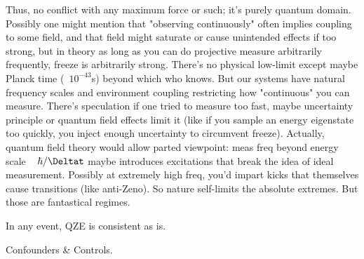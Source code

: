 \documentclass[11pt]{article}
\begin{document}
Thus, no conflict with any maximum force or such; it's purely quantum domain. Possibly one might mention that "observing continuously" often implies coupling to some field, and that field might saturate or cause unintended effects if too strong, but in theory as long as you can do projective measure arbitrarily frequently, freeze is arbitrarily strong. There's no physical low-limit except maybe Planck time (~$10^{-43}$s) beyond which who knows. But our systems have natural frequency scales and environment coupling restricting how "continuous" you can measure. There's speculation if one tried to measure too fast, maybe uncertainty principle or quantum field effects limit it (like if you sample an energy eigenstate too quickly, you inject enough uncertainty to circumvent freeze). Actually, quantum field theory would allow parted viewpoint: meas freq beyond energy scale ~ $\hbar/\Deltat$ maybe introduces excitations that break the idea of ideal measurement. Possibly at extremely high freq, you'd impart kicks that themselves cause transitions (like anti-Zeno). So nature self-limits the absolute extremes. But those are fantastical regimes.

In any event, QZE is consistent as is.


Confounders & Controls.
\end{document}
